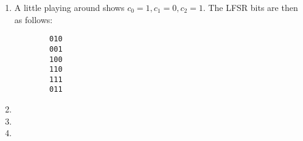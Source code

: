 \documentclass[12pt,letterpaper]{article}
\begin{document}
\pagestyle{fancy}
\rhead{\today}

\begin{enumerate}

    \item
    A little playing around shows $c_0 = 1, c_1 = 0, c_2 = 1$.  The LFSR bits are then as follows:
    \begin{verbatim}
        010
        001
        100
        110
        111
        011
    \end{verbatim}

    \item

    \item

    \item


\end{enumerate}
\end{document}
